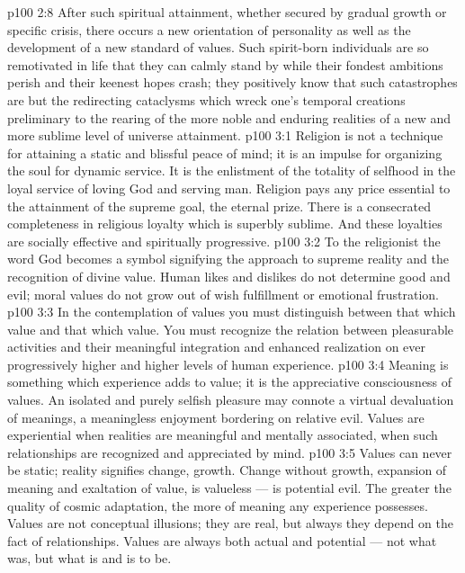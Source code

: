 \vs p100 2:8 After such spiritual attainment, whether secured by gradual growth or specific crisis, there occurs a new orientation of personality as well as the development of a new standard of values. Such spirit\hyp{}born individuals are so remotivated in life that they can calmly stand by while their fondest ambitions perish and their keenest hopes crash; they positively know that such catastrophes are but the redirecting cataclysms which wreck one’s temporal creations preliminary to the rearing of the more noble and enduring realities of a new and more sublime level of universe attainment.
\vs p100 3:1 Religion is not a technique for attaining a static and blissful peace of mind; it is an impulse for organizing the soul for dynamic service. It is the enlistment of the totality of selfhood in the loyal service of loving God and serving man. Religion pays any price essential to the attainment of the supreme goal, the eternal prize. There is a consecrated completeness in religious loyalty which is superbly sublime. And these loyalties are socially effective and spiritually progressive.
\vs p100 3:2 To the religionist the word God becomes a symbol signifying the approach to supreme reality and the recognition of divine value. Human likes and dislikes do not determine good and evil; moral values do not grow out of wish fulfillment or emotional frustration.
\vs p100 3:3 In the contemplation of values you must distinguish between that which  value and that which  value. You must recognize the relation between pleasurable activities and their meaningful integration and enhanced realization on ever progressively higher and higher levels of human experience.
\vs p100 3:4 \pc Meaning is something which experience adds to value; it is the appreciative consciousness of values. An isolated and purely selfish pleasure may connote a virtual devaluation of meanings, a meaningless enjoyment bordering on relative evil. Values are experiential when realities are meaningful and mentally associated, when such relationships are recognized and appreciated by mind.
\vs p100 3:5 \pc Values can never be static; reality signifies change, growth. Change without growth, expansion of meaning and exaltation of value, is valueless --- is potential evil. The greater the quality of cosmic adaptation, the more of meaning any experience possesses. Values are not conceptual illusions; they are real, but always they depend on the fact of relationships. Values are always both actual and potential --- not what was, but what is and is to be.

